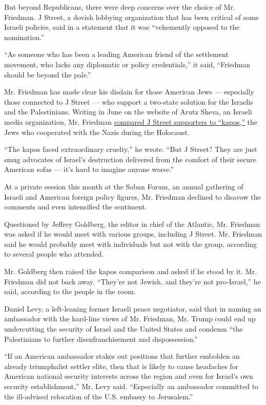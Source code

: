 But beyond Republicans, there were deep concerns over the choice of Mr.
Friedman. J Street, a dovish lobbying organization that has been
critical of some Israeli policies, said in a statement that it was
``vehemently opposed to the nomination.''

``As someone who has been a leading American friend of the settlement
movement, who lacks any diplomatic or policy credentials,'' it said,
``Friedman should be beyond the pale.''

Mr. Friedman has made clear his disdain for those American Jews ---
especially those connected to J Street --- who support a two-state
solution for the Israelis and the Palestinians. Writing in June on the
website of Arutz Sheva, an Israeli media organization, Mr. Friedman
\href{http://www.israelnationalnews.com/Articles/Article.aspx/18828}{compared
J Street supporters to ``kapos,''} the Jews who cooperated with the
Nazis during the Holocaust.

``The kapos faced extraordinary cruelty,'' he wrote. ``But J Street?
They are just smug advocates of Israel's destruction delivered from the
comfort of their secure American sofas --- it's hard to imagine anyone
worse.''

At a private session this month at the Saban Forum, an annual gathering
of Israeli and American foreign policy figures, Mr. Friedman declined to
disavow the comments and even intensified the sentiment.

Questioned by Jeffrey Goldberg, the editor in chief of the Atlantic, Mr.
Friedman was asked if he would meet with various groups, including J
Street. Mr. Friedman said he would probably meet with individuals but
not with the group, according to several people who attended.

Mr. Goldberg then raised the kapos comparison and asked if he stood by
it. Mr. Friedman did not back away. ``They're not Jewish, and they're
not pro-Israel,'' he said, according to the people in the room.

Daniel Levy, a left-leaning former Israeli peace negotiator, said that
in naming an ambassador with the hard-line views of Mr. Friedman, Mr.
Trump could end up undercutting the security of Israel and the United
States and condemn ``the Palestinians to further disenfranchisement and
dispossession.''

``If an American ambassador stakes out positions that further embolden
an already triumphalist settler elite, then that is likely to cause
headaches for American national security interests across the region and
even for Israel's own security establishment,'' Mr. Levy said.
``Especially an ambassador committed to the ill-advised relocation of
the U.S. embassy to Jerusalem.''

